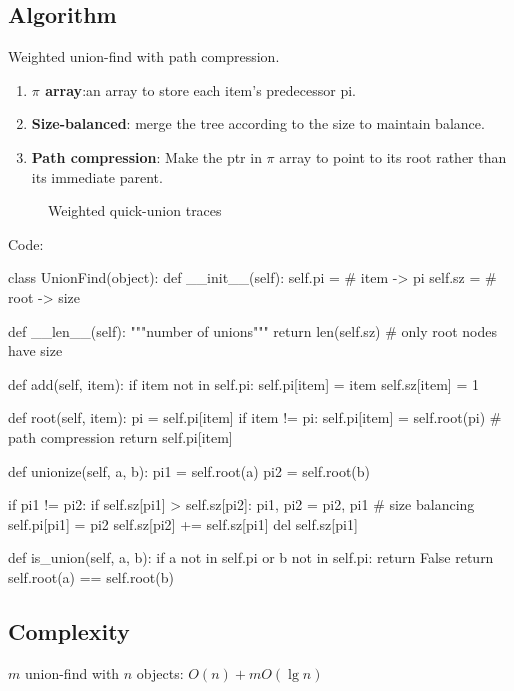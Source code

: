 \subsection{Algorithm}
Weighted union-find with path compression.\\
\begin{enumerate}
\item \textbf{$\pi$ array}:an array to store each item's predecessor pi. 
\item \textbf{Size-balanced}: merge the tree according to the size to maintain balance.
\item \textbf{Path compression}: Make the ptr in $\pi$ array to point to its root rather than its immediate parent. 
\end{enumerate}
\begin{figure}[H]
\centering
\subfloat{\texttt{[image: uf]}}
\caption{Weighted quick-union traces}
\label{fig:union_find}
\end{figure}
Code:
\begin{python}
class UnionFind(object):
    def __init__(self):
        self.pi = {}  # item -> pi
        self.sz = {}  # root -> size

    def __len__(self):
        """number of unions"""
        return len(self.sz)  # only root nodes have size

    def add(self, item):
        if item not in self.pi:
            self.pi[item] = item
            self.sz[item] = 1

    def root(self, item):
        pi = self.pi[item]
        if item != pi:
            self.pi[item] = self.root(pi)
            # path compression 
        return self.pi[item]

    def unionize(self, a, b):
        pi1 = self.root(a)
        pi2 = self.root(b)

        if pi1 != pi2:
            if self.sz[pi1] > self.sz[pi2]:
                pi1, pi2 = pi2, pi1
                # size balancing
            self.pi[pi1] = pi2
            self.sz[pi2] += self.sz[pi1]
            del self.sz[pi1]
        
    def is_union(self, a, b):
        if a not in self.pi or b not in self.pi:
          return False 
        return self.root(a) == self.root(b)
        
\end{python}

\subsection{Complexity}
$m$ union-find with $n$ objects: $O(n)+m O(\lg n)$


